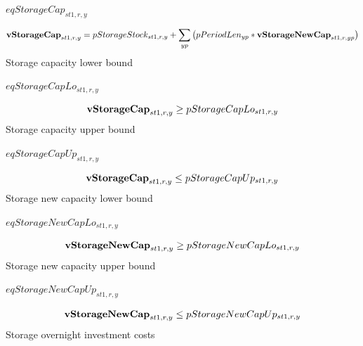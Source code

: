 \documentclass{article}
\begin{document}
$eqStorageCap_{st1,r,y}$





\begin{dmath} 
{\bf vStorageCap}_{st1,r,y}  =  pStorageStock_{st1,r,y}+\sum_{yp}{\left(pPeriodLen_{yp}*{\bf vStorageNewCap}_{st1,r,yp}\right)}
\end{dmath} 
Storage capacity lower bound







$eqStorageCapLo_{st1,r,y}$





\begin{dmath} 
{\bf vStorageCap}_{st1,r,y}  \ge  pStorageCapLo_{st1,r,y}
\end{dmath} 
Storage capacity upper bound







$eqStorageCapUp_{st1,r,y}$





\begin{dmath} 
{\bf vStorageCap}_{st1,r,y}  \le  pStorageCapUp_{st1,r,y}
\end{dmath} 
Storage new capacity lower bound







$eqStorageNewCapLo_{st1,r,y}$





\begin{dmath} 
{\bf vStorageNewCap}_{st1,r,y}  \ge  pStorageNewCapLo_{st1,r,y}
\end{dmath} 
Storage new capacity upper bound







$eqStorageNewCapUp_{st1,r,y}$





\begin{dmath} 
{\bf vStorageNewCap}_{st1,r,y}  \le  pStorageNewCapUp_{st1,r,y}
\end{dmath} 
Storage overnight investment costs
\end{document}

